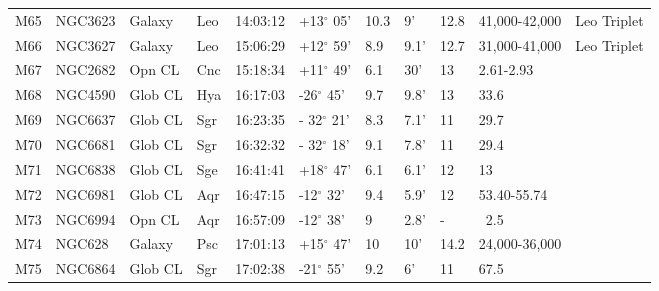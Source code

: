 \documentclass[10pt,twoside,a4paper,english]{article}
\begin{document}
\begin{longtable}{@{}lllllllllll@{}}
M65        & NGC3623     & Galaxy     & Leo       & 14:03:12 & +13$^{\circ}$ 05'  & 10.3      & 9'                   & 12.8     & 41,000-42,000       & Leo Triplet                               \\ 
M66        & NGC3627     & Galaxy     & Leo       & 15:06:29 & +12$^{\circ}$ 59'  & 8.9       & 9.1'                 & 12.7     & 31,000-41,000       & Leo Triplet                               \\ 
M67        & NGC2682     & Opn CL     & Cnc       & 15:18:34 & +11$^{\circ}$ 49'  & 6.1       & 30'                  & 13       & 2.61-2.93           &                                           \\ 
M68        & NGC4590     & Glob CL    & Hya       & 16:17:03 & -26$^{\circ}$ 45'  & 9.7       & 9.8'                 & 13       & 33.6                &                                           \\ 
M69        & NGC6637     & Glob CL    & Sgr       & 16:23:35 & - 32$^{\circ}$ 21' & 8.3       & 7.1'                 & 11       & 29.7                &                                           \\ 
M70        & NGC6681     & Glob CL    & Sgr       & 16:32:32 & - 32$^{\circ}$ 18' & 9.1       & 7.8'                 & 11       & 29.4                &                                           \\ 
M71        & NGC6838     & Glob CL    & Sge       & 16:41:41 & +18$^{\circ}$ 47'  & 6.1       & 6.1'                 & 12       & 13                  &                                           \\ 
M72        & NGC6981     & Glob CL    & Aqr       & 16:47:15 & -12$^{\circ}$ 32'  & 9.4       & 5.9'                 & 12       & 53.40-55.74         &                                           \\ 
M73        & NGC6994     & Opn CL     & Aqr       & 16:57:09 & -12$^{\circ}$ 38'  & 9         & 2.8'                 & -        & ~2.5                &                                           \\ 
M74        & NGC628      & Galaxy     & Psc       & 17:01:13 & +15$^{\circ}$ 47'  & 10        & 10'                  & 14.2     & 24,000-36,000       &                                           \\ 
M75        & NGC6864     & Glob CL    & Sgr       & 17:02:38 & -21$^{\circ}$ 55'  & 9.2       & 6'                   & 11       & 67.5                &                                           \\ 

\end{longtable}
\end{document}
